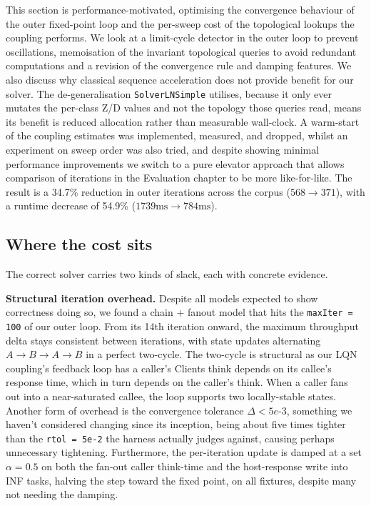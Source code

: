 This section is performance-motivated, optimising the convergence behaviour of the outer fixed-point loop and the per-sweep cost of the topological lookups the coupling performs. We look at a limit-cycle detector in the outer loop to prevent oscillations, memoisation of the invariant topological queries to avoid redundant computations and a revision of the convergence rule and damping features. We also discuss why classical sequence acceleration does not provide benefit for our solver. The de-generalisation \texttt{SolverLNSimple} utilises, because it only ever mutates the per-class Z/D values and not the topology those queries read, means its benefit is reduced allocation rather than measurable wall-clock. A warm-start of the coupling estimates was implemented, measured, and dropped, whilst an experiment on sweep order was also tried, and despite showing minimal performance improvements we switch to a pure elevator approach that allows comparison of iterations in the Evaluation chapter to be more like-for-like. The result is a 34.7\% reduction in outer iterations across the corpus ($568 \rightarrow 371$), with a runtime decrease of 54.9\% ($1739 \text{ms} \rightarrow 784 \text{ms}$). 


\subsection{Where the cost sits}

The correct solver carries two kinds of slack, each with concrete evidence.

\textbf{Structural iteration overhead.} Despite all models expected to show correctness doing so, we found a chain + fanout model that hits the \texttt{maxIter = 100} of our outer loop. From its 14th iteration onward, the maximum throughput delta stays consistent between iterations, with state updates alternating $A \rightarrow B \rightarrow A \rightarrow B$ in a perfect two-cycle. The two-cycle is structural as our LQN coupling's feedback loop has a caller's Clients think depends on its callee's response time, which in turn depends on the caller's think. When a caller fans out into a near-saturated callee, the loop supports two locally-stable states. Another form of overhead is the convergence tolerance \texttt{$\Delta < 5e\text{-}3$}, something we haven't considered changing since its inception, being about five times tighter than the \texttt{rtol = 5e-2} the harness actually judges against, causing perhaps unnecessary tightening. Furthermore, the per-iteration update is damped at a set $\alpha = 0.5$ on both the fan-out caller think-time and the host-response write into INF tasks, halving the step toward the fixed point, on all fixtures, despite many not needing the damping.

